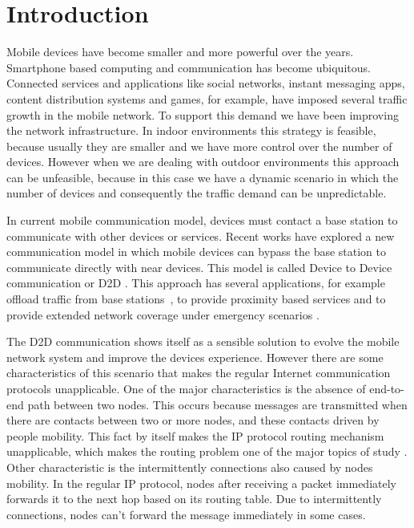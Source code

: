 \chapter{Introduction}
\label{ch:Introduction}

Mobile devices have become smaller and more powerful over the years. Smartphone based computing and communication has become ubiquitous.
Connected services and applications like social networks, instant messaging apps, content distribution systems and games, for example, have imposed several traffic growth in the mobile network.
To support this demand we have been improving the network infrastructure. In indoor environments this strategy is feasible, because usually
they are smaller and we have more control over the number of devices. However when we are dealing with outdoor environments this approach can be
unfeasible, because in this case we have a dynamic scenario in which the number of devices and consequently the traffic demand can be unpredictable.

In current mobile communication model, devices must contact a base station to communicate with other devices or services.
Recent works have explored a new communication model in which mobile devices can bypass the base station to communicate directly
with near devices. This model is called Device to Device communication or D2D \cite{yang2013solving}. This approach has several applications,
for example offload traffic from base stations~\cite{yang2013solving,nunes2016leveraging,aijaz2013survey,pyattaev2013proximity,andreev2014cellular,bastug2014living},
to provide proximity based services \cite{lin2014overview} and  to provide extended network coverage under emergency scenarios \cite{babun2015multi}.

The D2D communication shows itself as a sensible solution to evolve the mobile network system and improve the devices experience. However there
are some characteristics of this scenario that makes the regular Internet communication protocols unapplicable. One of the major characteristics is
the absence of end-to-end path between two nodes. This occurs because messages are transmitted when there are contacts between two or more nodes, and
these contacts driven by people mobility. This fact by itself makes the IP protocol routing mechanism unapplicable, which makes the routing problem
one of the major topics of study \cite{misra2016opportunistic}. Other characteristic is the intermittently connections also caused by nodes mobility.
In the regular IP protocol, nodes after receiving a packet immediately forwards it to the next hop based on its routing table. Due to intermittently connections,
nodes can't forward the message immediately in some cases.

